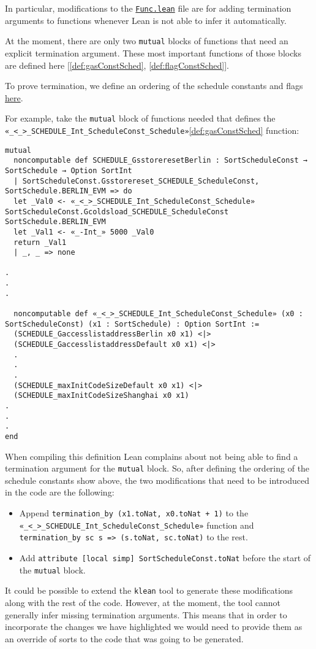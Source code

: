 In particular, modifications to the
\href{https://runtimeverification.github.io/evm-equivalence/docs/EvmEquivalence/KEVM2Lean/Func.html}{\texttt{Func.lean}}
file are for adding termination arguments to functions whenever Lean is not able
to infer it automatically.

At the moment, there are only two \texttt{mutual} blocks of functions that need
an explicit termination argument. These most important functions of those blocks
are defined here [\ref{def:gasConstSched}, \ref{def:flagConstSched}].

To prove termination, we define an ordering of the schedule constants and flags
\href{https://runtimeverification.github.io/evm-equivalence/docs/EvmEquivalence/KEVM2Lean/ScheduleOrdering.html}{here}.

For example, take the \texttt{mutual} block of functions needed that defines the \texttt{«_<_>_SCHEDULE_Int_ScheduleConst_Schedule»}\ref{def:gasConstSched} function:

\begin{verbatim}
mutual
  noncomputable def SCHEDULE_GsstoreresetBerlin : SortScheduleConst → SortSchedule → Option SortInt
  | SortScheduleConst.Gsstorereset_SCHEDULE_ScheduleConst, SortSchedule.BERLIN_EVM => do
  let _Val0 <- «_<_>_SCHEDULE_Int_ScheduleConst_Schedule» SortScheduleConst.Gcoldsload_SCHEDULE_ScheduleConst SortSchedule.BERLIN_EVM
  let _Val1 <- «_-Int_» 5000 _Val0
  return _Val1
  | _, _ => none

.
.
.

  noncomputable def «_<_>_SCHEDULE_Int_ScheduleConst_Schedule» (x0 : SortScheduleConst) (x1 : SortSchedule) : Option SortInt :=
  (SCHEDULE_GaccesslistaddressBerlin x0 x1) <|>
  (SCHEDULE_GaccesslistaddressDefault x0 x1) <|>
  .
  .
  .
  (SCHEDULE_maxInitCodeSizeDefault x0 x1) <|>
  (SCHEDULE_maxInitCodeSizeShanghai x0 x1)
.
.
.
end
\end{verbatim}

When compiling this definition Lean complains about not being able to find a termination argument for the \texttt{mutual} block.
So, after defining the ordering of the schedule constants show above, the two modifications that need to be introduced in the code are the following:

\begin{itemize}
\item Append \texttt{termination_by (x1.toNat, x0.toNat + 1)} to the \texttt{«_<_>_SCHEDULE_Int_ScheduleConst_Schedule»} function and \texttt{termination_by sc s => (s.toNat, sc.toNat)} to the rest.
\item Add \texttt{attribute [local simp] SortScheduleConst.toNat} before the start of the \texttt{mutual} block.
\end{itemize}

It could be possible to extend the \texttt{klean} tool to generate these modifications along with the rest of the code. However, at the moment, the tool cannot generally infer missing termination arguments. This means that in order to incorporate the changes we have highlighted we would need to provide them as an override of sorts to the code that was going to be generated.
